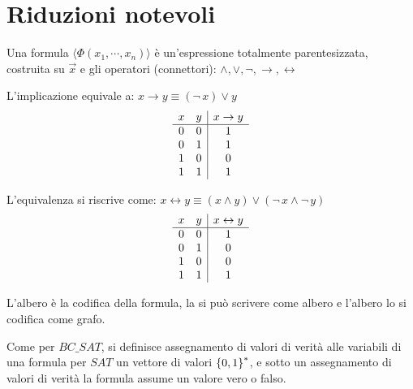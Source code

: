 \section{Riduzioni notevoli}

\begin{definition}[Formula]
    \label{def:formula}
    Una formula $\langle \Phi \left( x_1, \cdots, x_n \right) \rangle$ è un'espressione totalmente parentesizzata, costruita su $\vec{x}$ e gli operatori (connettori):
    $\wedge, \vee, \neg, \to, \leftrightarrow$
\end{definition}

L'implicazione equivale a: $x \to y \equiv ( \neg \, x ) \vee y$
\begin{equation*}
    \begin{array}[h]{cc|c}
        x & y & x \to y \\
        \hline
        0 & 0 & 1 \\
        0 & 1 & 1 \\
        1 & 0 & 0 \\
        1 & 1 & 1 \\
    \end{array}
\end{equation*}

L'equivalenza si riscrive come:
$ x \leftrightarrow y \equiv 
\left( x \wedge y \right)
\vee
\left( \neg \, x \wedge \neg \, y \right)
$
\begin{equation*}
    \begin{array}[h]{cc|c}
        x & y & x \leftrightarrow y \\
        \hline
        0 & 0 & 1 \\
        0 & 1 & 0 \\
        1 & 0 & 0 \\
        1 & 1 & 1 \\
    \end{array}
\end{equation*}


L'albero è la codifica della formula, la si può scrivere come albero e l'albero lo si codifica come grafo.

Come per $BC\_SAT$, si definisce assegnamento di valori di verità alle variabili di una formula per $SAT$ un vettore di valori $\left\{0,1\right\}^{*}$, e sotto un assegnamento di valori di verità la formula assume un valore vero o falso.

